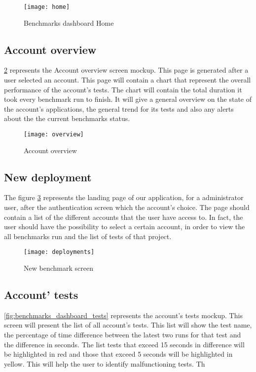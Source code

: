 \begin{figure}[ht]
\texttt{[image: home]}
\caption{Benchmarks dashboard Home}
\label{fig:benchmarks_dashboard_home}
\end{figure}

\subsection{Account overview}
\hyperref[fig:benchmarks_dashboard_overview]{\ref{fig:benchmarks_dashboard_overview}}
represents the Account overview screen mockup. This page is generated after a
user selected an account. This page will contain a chart that represent the
overall performance of the account's tests. The chart will contain the total
duration it took every benchmark run to finish. It will give a general overview
on the state of the account's applications, the general trend for its tests and
also any alerts about the the current benchmarks status.

\begin{figure}[ht]
\texttt{[image: overview]}
\caption{Account overview}
\label{fig:benchmarks_dashboard_overview}
\end{figure}

\subsection{New deployment}
The figure
\hyperref[fig:benchmarks_dashboard_home]{\ref{fig:benchmarks_dashboard_home}}
represents the landing page of our application, for a administrator user,
after the authentication screen which the account's choice. The page should
contain a list of the different accounts that the user have access to. In fact,
the user should have the possibility to select a certain account, in order to
view the all benchmarks run and the list of tests of that project.

\begin{figure}[ht]
  \texttt{[image: deployments]}
  \caption{New benchmark screen}
\label{fig:benchmarks_dashboard_home}
\end{figure}

\subsection{Account' tests}
\hyperref[fig:benchmarks_dashboard_tests]{\ref{fig:benchmarks_dashboard_tests}}
represents the account's tests mockup. This screen will present the list of all
account's tests. This list will show the test name, the percentage of time
difference between the latest two runs for that test and the difference in
seconds. The list tests that exceed 15 seconds in difference will be highlighted
in red and those that exceed 5 seconds will be highlighted in yellow. This will
help the user to identify malfunctioning tests. Th

